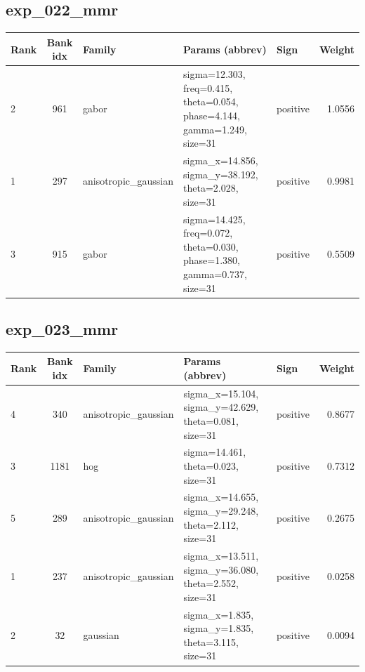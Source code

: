 \documentclass{article}
\begin{document}
\subsection*{exp\_022\_mmr}
\begin{center}
\begin{tabular}{lclllr}
\toprule
Rank & Bank idx & Family & Params (abbrev) & Sign & Weight \\
\midrule

2 & 961 & gabor & sigma=12.303, freq=0.415, theta=0.054, phase=4.144, gamma=1.249, size=31 & positive & 1.0556 \\
1 & 297 & anisotropic\_gaussian & sigma\_x=14.856, sigma\_y=38.192, theta=2.028, size=31 & positive & 0.9981 \\
3 & 915 & gabor & sigma=14.425, freq=0.072, theta=0.030, phase=1.380, gamma=0.737, size=31 & positive & 0.5509 \\
\bottomrule
\end{tabular}
\end{center}

\subsection*{exp\_023\_mmr}
\begin{center}
\begin{tabular}{lclllr}
\toprule
Rank & Bank idx & Family & Params (abbrev) & Sign & Weight \\
\midrule

4 & 340 & anisotropic\_gaussian & sigma\_x=15.104, sigma\_y=42.629, theta=0.081, size=31 & positive & 0.8677 \\
3 & 1181 & hog & sigma=14.461, theta=0.023, size=31 & positive & 0.7312 \\
5 & 289 & anisotropic\_gaussian & sigma\_x=14.655, sigma\_y=29.248, theta=2.112, size=31 & positive & 0.2675 \\
1 & 237 & anisotropic\_gaussian & sigma\_x=13.511, sigma\_y=36.080, theta=2.552, size=31 & positive & 0.0258 \\
2 & 32 & gaussian & sigma\_x=1.835, sigma\_y=1.835, theta=3.115, size=31 & positive & 0.0094 \\
\bottomrule
\end{tabular}
\end{center}
\end{document}
